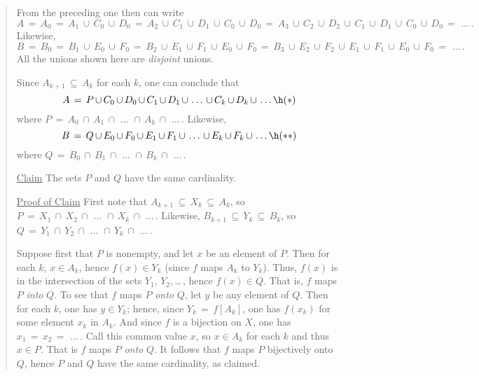 {\begin{quotation}
{\V

\noindent From the preceding one then can write
        \begin{displaymath}
        A \,=\, A_{0} \,=\, A_{1}\,{\cup}\,C_{0}\,{\cup}\,D_{0} \,=\, A_{2}\,{\cup}\,C_{1}\,{\cup}\,D_{1}\,{\cup}\,C_{0}\,{\cup}\,D_{0} \,=\, 
A_{3}\,{\cup}\,C_{2}\,{\cup}\,D_{2}\,{\cup}\,C_{1}\,{\cup}\,D_{1}\,{\cup}\,C_{0}\,{\cup}\,D_{0} \,=\, \,{\ldots}\,.
        \end{displaymath}
    Likewise,
        \begin{displaymath}
        B \,=\, B_{0} \,=\, B_{1}\,{\cup}\,E_{0}\,{\cup}\,F_{0} \,=\, B_{2}\,{\cup}\,E_{1}\,{\cup}\,F_{1}\,{\cup}\,E_{0}\,{\cup}\,F_{0} \,=\,
B_{3}\,{\cup}\,E_{2}\,{\cup}\,F_{2}\,{\cup}\,E_{1}\,{\cup}\,F_{1}\,{\cup}\,E_{0}\,{\cup}\,F_{0} \,=\, \,{\ldots}\,.
        \end{displaymath}
    All the unions shown here are {\em disjoint} unions.

        Since $A_{k+1} \,{\subseteq}\, A_{k}$ for each $k$, one can conclude that
        \begin{displaymath}
        A \,=\, P\,{\cup}\, C_{0}\,{\cup}\,D_{0}\,{\cup}\,C_{1}\,{\cup}\,D_{1}\,{\cup}\,\,{\ldots}\,\,{\cup}\,C_{k}\,{\cup}\,D_{k}\,{\cup}\,\,{\ldots}\, \h ({\ast})
        \end{displaymath}
    where $P \,=\, A_{0}\,{\cap}\,A_{1}\,{\cap}\,\, {\ldots}\,\,{\cap}\,A_{k}\,{\cap}\,\,{\ldots}\,$.
    Likewise,
        \begin{displaymath}
        B \,=\, Q\,{\cup}\, E_{0}\,{\cup}\,F_{0}\,{\cup}\,E_{1}\,{\cup}\,F_{1}\,{\cup}\,\,{\ldots}\,\,{\cup}\,E_{k}\,{\cup}\,F_{k}\,{\cup}\,\,{\ldots}\, \h ({\ast}{\ast})
        \end{displaymath}
    where $Q \,=\, B_{0}\,{\cap}\,B_{1}\,{\cap}\,\, {\ldots}\,\,{\cap}\,B_{k}\,{\cap}\,\,{\ldots}\,$.

        \underline{Claim} The sets $P$ and $Q$ have the same cardinality.

        \underline{Proof of Claim} First note that $A_{k+1} \,{\subseteq}\, X_{k} \,{\subseteq}\, A_{k}$, so $P \,=\,X_{1}\,{\cap}\,X_{2}\,{\cap}\,\,{\ldots}\,\,{\cap}\,X_{k}\,{\cap}\,\,{\ldots}\,$.
    Likewise, $B_{k+1} \,{\subseteq}\, Y_{k} \,{\subseteq}\, B_{k}$, so $Q \,=\, Y_{1}\,{\cap}\,Y_{2}\,{\cap}\,\,{\ldots}\,\,{\cap}\,Y_{k}\,{\cap}\,\,{\ldots}\,$.

        Suppose first that $P$ is nonempty, and let $x$ be an element of $P$. Then for each $k$, $x{\in}A_{k}$, hence $f(x){\in}Y_{k}$ (since $f$ maps $A_{k}$ to $Y_{k}$).
    Thus, $f(x)$ is in the intersection of the sets $Y_{1}$, $Y_{2}$,\,{\ldots}\,, hence $f(x){\in}Q$. That is, $f$ maps $P$ {\em into} $Q$.
    To see that $f$ maps $P$ {\em onto} $Q$, let $y$ be any element of $Q$. Then for each $k$, one has $y{\in}Y_{k}$; hence, since $Y_{k} \,=\, f[A_{k}]$,
    one has $f(x_{k})$ for some element $x_{k}$ in $A_{k}$. And since $f$ is a bijection on $X$, one has $x_{1} \,=\, x_{2} \,=\, \,{\ldots}\,$.
    Call this common value $x$, so $x{\in}A_{k}$ for each $k$ and thus $x{\in}P$.
    That is $f$ maps $P$ {\em onto} $Q$.  It follows that $f$ maps $P$ bijectively onto $Q$, hence $P$ and $Q$ have the same cardinality, as claimed.

}
\end{quotation}}
